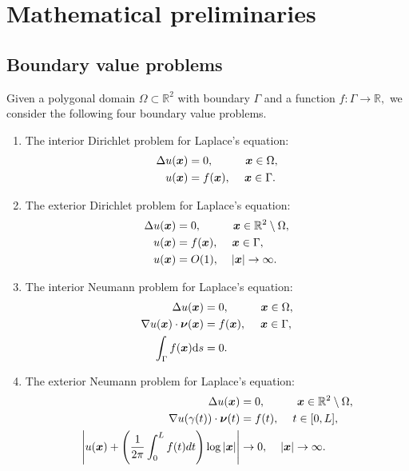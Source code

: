 \section{Mathematical preliminaries}
\subsection{Boundary value problems}
Given a polygonal domain  $\Omega \subset \mathbb{R}^2$ with boundary $\Gamma$ and a function
$f: \Gamma \to \mathbb{R},$ we consider 
the following four boundary value problems. 

\begin{enumerate}
\item The interior Dirichlet problem for Laplace's equation:
\begin{align}\label{eqn:BVPIDL}
\Delta u(\boldsymbol{x}) &= 0, \hspace{1 cm} \boldsymbol{x} \in \Omega,\\
u(\boldsymbol{x}) &= f(\boldsymbol{x}), \hspace{0.43 cm} \boldsymbol{x} \in \Gamma.
\end{align}

\item The exterior Dirichlet problem for Laplace's equation:
\begin{align}\label{eqn:BVPEDL}
\Delta u(\boldsymbol{x}) &= 0, \hspace{1 cm} \boldsymbol{x} \in \mathbb{R}^2\setminus\Omega,\\
u(\boldsymbol{x}) &= f(\boldsymbol{x}), \hspace{0.43 cm}\boldsymbol{x} \in \Gamma, \\
u(\boldsymbol{x}) &= O(1) , \hspace{0.4cm} |\boldsymbol{x}| \to \infty.
\end{align}

\item The interior Neumann problem for Laplace's equation:
\begin{align}\label{eqn:BVPINL}
\Delta u(\boldsymbol{x}) &= 0, \hspace{1 cm} \boldsymbol{x} \in \Omega,\\
\nabla u(\boldsymbol{x})\cdot \boldsymbol{\nu}(\boldsymbol{x})  &= f(\boldsymbol{x}), \hspace{0.45 cm} \boldsymbol{x} \in \Gamma,\\
\int_\Gamma f(\boldsymbol{x}) {\rm d}s &= 0.
\end{align}

\item The exterior Neumann problem for Laplace's equation:
\begin{align}\label{eqn:BVPEDL}
\Delta u(\boldsymbol{x}) &= 0, \hspace{1 cm} \boldsymbol{x} \in \mathbb{R}^2\setminus\Omega,\\
\nabla u(\gamma(t))\cdot \boldsymbol{\nu}(t)  &= f(t), \hspace{0.43 cm} t \in[0,L], \\
\left|u(\boldsymbol{x}) + \left(\frac{1}{2\pi} \int_{0}^{L} f(t) dt\right) \log{|\boldsymbol{x}|}\right| &\to 0 , \hspace{0.4cm} |\boldsymbol{x}| \to \infty.
\end{align}


\end{enumerate}
